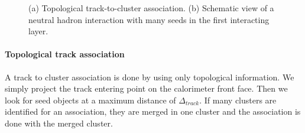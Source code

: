 \documentclass[cits]{JINST}
\begin{document}
\begin{center}
  \begin{figure}[!ht]
    \hfill 
    \caption{(a) Topological track-to-cluster association. (b) Schematic view of a neutral hadron interaction with many seeds in the first interacting layer.}
    \label{ARBOR_ASSOCIATION_ALGORITHMS}
  \end{figure}
\end{center}

\paragraph*{Topological track association} A track to cluster association is done by using only topological information. We simply project the track entering point on the calorimeter front face. Then we look for seed objects at a maximum distance of $\Delta_{track}$. If many clusters are identified for an association, they are merged in one cluster and the association is done with the merged cluster. 
\end{document}
